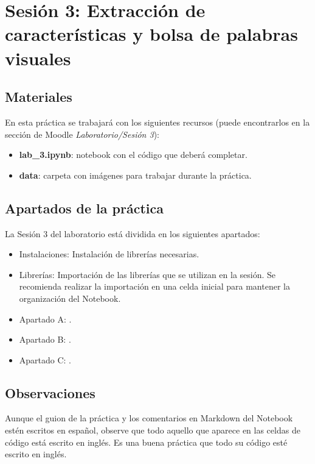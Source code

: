 \chapter{Sesión 3: Extracción de características y bolsa de palabras visuales}
\label{chapter:introduction_ses_3}

\section{Materiales}

En esta práctica se trabajará con los siguientes recursos (puede encontrarlos en la sección de Moodle \textit{Laboratorio/Sesión 3}):

\begin{itemize}
    \item \textbf{lab\_3.ipynb}: notebook con el código que deberá completar.
    \item \textbf{data}: carpeta con imágenes para trabajar durante la práctica.
\end{itemize}

\section{Apartados de la práctica}

La Sesión 3 del laboratorio está dividida en los siguientes apartados:

\begin{itemize}
    \item Instalaciones: Instalación de librerías necesarias.
    \item Librerías: Importación de las librerías que se utilizan en la sesión. Se recomienda realizar la importación en una celda inicial para mantener la organización del Notebook.
    \item Apartado A: .
    \item Apartado B: .
    \item Apartado C: .
\end{itemize}

\section{Observaciones}

Aunque el guion de la práctica y los comentarios en Markdown del Notebook estén escritos en español, observe que todo aquello que aparece en las celdas de código está escrito en inglés. Es una buena práctica que todo su código esté escrito en inglés.


